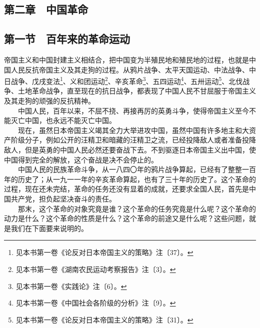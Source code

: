 \documentclass[cn,11pt,chinese]{elegantbook}
\def\myformat#1{\hfil\hfil #1}
\begin{document}
\subsection*{\myformat{第二章　中国革命}}

\subsection*{\myformat{第一节　百年来的革命运动}}
帝国主义和中国封建主义相结合，把中国变为半殖民地和殖民地的过程，也就是中国人民反抗帝国主义及其走狗的过程。从鸦片战争、太平天国运动、中法战争、中日战争、戊戌变法\footnote[27]{ 见本书第一卷《论反对日本帝国主义的策略》注〔37〕。}、义和团运动\footnote[28]{ 见本书第一卷《湖南农民运动考察报告》注〔3〕。}、辛亥革命\footnote[29]{ 见本书第一卷《实践论》注〔6〕。}、五四运动\footnote[30]{ 见本书第一卷《中国社会各阶级的分析》注〔9〕。}、五卅运动\footnote[31]{ 见本书第一卷《论反对日本帝国主义的策略》注〔31〕。}、北伐战争、土地革命战争，直至现在的抗日战争，都表现了中国人民不甘屈服于帝国主义及其走狗的顽强的反抗精神。\\
　　中国人民，百年以来，不屈不挠、再接再厉的英勇斗争，使得帝国主义至今不能灭亡中国，也永远不能灭亡中国。\\
　　现在，虽然日本帝国主义竭其全力大举进攻中国，虽然中国有许多地主和大资产阶级分子，例如公开的汪精卫和暗藏的汪精卫之流，已经投降敌人或者准备投降敌人，但是英勇的中国人民必然还要奋战下去。不到驱逐日本帝国主义出中国，使中国得到完全的解放，这个奋战是决不会停止的。\\
　　中国人民的民族革命斗争，从一八四〇年的鸦片战争算起，已经有了整整一百年的历史了；从一九一一年的辛亥革命算起，也有了三十年的历史了。这个革命的过程，现在还未完结，革命的任务还没有显着的成就，还要求全国人民，首先是中国共产党，担负起坚决奋斗的责任。\\
　　那末，这个革命的对象究竟是谁？这个革命的任务究竟是什么呢？这个革命的动力是什么？这个革命的性质是什么？这个革命的前途又是什么呢？这些问题，就是我们在下面要来说明的。\\
\end{document}
